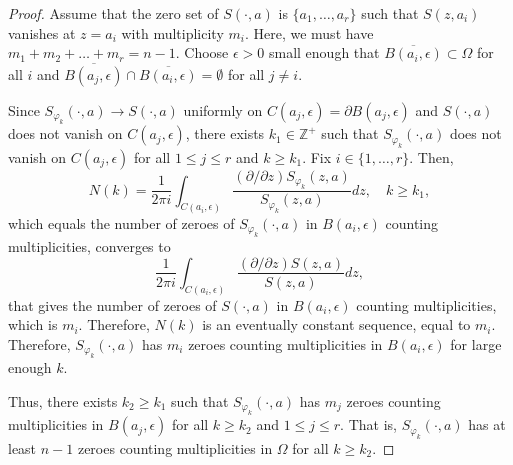 \documentclass[11pt, reqno]{amsart}
\numberwithin{equation}{section}
\begin{document}
\begin{proof}
Assume that the zero set of $S(\cdot, a)$ is $\{a_1,\ldots,a_{r}\}$ such that $S(z,a_i)$ vanishes at $z=a_i$ with multiplicity $m_i$. Here, we must have $m_1 + m_2 + \ldots + m_r = n-1$. Choose $\epsilon>0$ small enough that $\overline{B(a_i,\epsilon)}\subset\Omega$ for all $i$ and $\overline{B(a_j,\epsilon)}\cap\overline{B(a_i,\epsilon)}=\emptyset$ for all $j\neq i$.  

\medskip

Since $S_{\varphi_k}(\cdot,a)\rightarrow S(\cdot,a)$ uniformly on $C(a_j,\epsilon) = \partial B(a_j, \epsilon)$ and $S(\cdot,a)$ does not vanish on $C(a_j,\epsilon)$, there exists $k_1\in \mathbb{Z}^+$ such that $S_{\varphi_k}(\cdot,a)$ does not vanish on $C(a_j,\epsilon)$ for all $1\leq j\leq r$ and $k\geq k_1$. Fix $i\in \{1,\ldots,r\}$. Then,
\[
N(k) = \frac{1}{2\pi i} \int_{C(a_i,\epsilon)}\frac{(\partial/\partial z)S_{\varphi_k}(z,a)}{S_{\varphi_k}(z,a)} dz,\quad k\geq k_1,
\]
which equals the number of zeroes of $S_{\varphi_k}(\cdot,a)$ in $B(a_i,\epsilon)$ counting multiplicities, converges to 
\[
\frac{1}{2\pi i} \int_{C(a_i,\epsilon)}\frac{(\partial/\partial z)S(z,a)}{S(z,a)} dz,
\]
that gives the number of zeroes of $S(\cdot,a)$ in $B(a_i,\epsilon)$ counting multiplicities, which is $m_i$. Therefore, $N(k)$ is an eventually constant sequence, equal to $m_i$. Therefore, $S_{\varphi_k}(\cdot,a)$ has $m_i$ zeroes counting multiplicities in $B(a_i,\epsilon)$ for large enough $k$. 

\medskip 

Thus, there exists $k_2\geq k_1$ such that $S_{\varphi_k}(\cdot,a)$ has $m_j$ zeroes counting multiplicities in $B(a_j,\epsilon)$ for all $k\geq k_2$ and $1\leq j\leq r$. That is, $S_{\varphi_k}(\cdot,a)$ has at least $n-1$ zeroes counting multiplicities in $\Omega$ for all $k\geq k_2$. 

\medskip


\end{proof}
\end{document}
